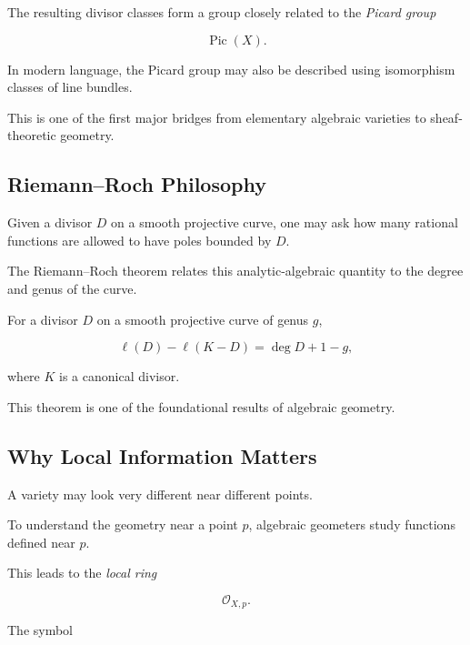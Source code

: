 The resulting divisor classes form a group closely related to the
\emph{Picard group}

\[
\boxed{
\operatorname{Pic}(X).
}
\]

In modern language, the Picard group may also be described using isomorphism
classes of line bundles.

This is one of the first major bridges from elementary algebraic varieties
to sheaf-theoretic geometry.

\subsection{Riemann--Roch Philosophy}
\label{subsec:riemann-roch-philosophy}

Given a divisor \(D\) on a smooth projective curve, one may ask how many
rational functions are allowed to have poles bounded by \(D\).

The Riemann--Roch theorem relates this analytic-algebraic quantity to the
degree and genus of the curve.

\begin{theorem}
For a divisor \(D\) on a smooth projective curve of genus \(g\),

\[
\boxed{
\ell(D)-\ell(K-D)
=
\deg D+1-g,
}
\]

where \(K\) is a canonical divisor.
\end{theorem}

This theorem is one of the foundational results of algebraic geometry.

\subsection{Why Local Information Matters}
\label{subsec:local-information-algebraic-geometry}

A variety may look very different near different points.

To understand the geometry near a point \(p\), algebraic geometers study
functions defined near \(p\).

This leads to the \emph{local ring}

\[
\boxed{
\mathcal{O}_{X,p}.
}
\]

The symbol

